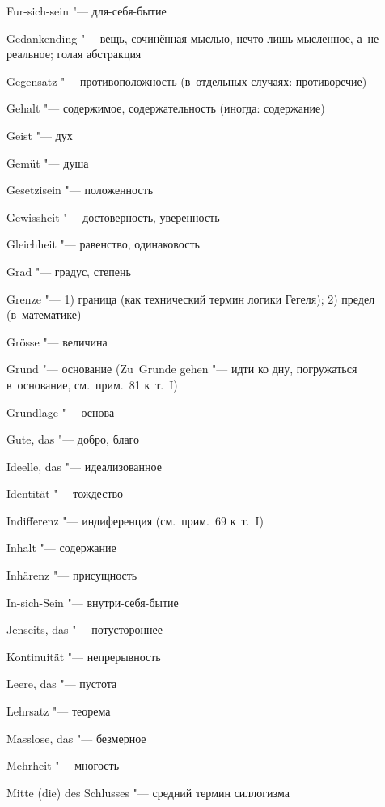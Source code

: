 \begin{multicols}{2}
Fur-sich-sein "--- для-себя-бытие

\bigskip

Gedank\-ending "--- вещь, сочинённая мыслью, нечто лишь мысленное,
а~не реальное; голая абстракция

Gegen\-satz "--- противоположность (в~отдельных случаях:
противоречие)

Gehalt "--- содержимое, содержательность (иногда: содержание)

Geist "--- дух

Gemüt "--- душа

Gesetzi\-sein "--- положенность

Gewiss\-heit "--- достоверность, уверенность

Gleich\-heit "--- равенство, одинаковость

Grad "--- градус, степень

Grenze "--- 1) граница (как технический термин логики Гегеля); 2) предел
(в~математике)

Grösse "--- величина

Grund "--- основание (Zu~Grunde gehen "--- идти ко дну,
погружаться в~основание, см.~прим.~81 к~т.~I)

Grundlage "--- основа

Gute, das "--- добро, благо

\bigskip

Ideelle, das "--- идеализованное

Identität "--- тождество

Indiffe\-renz "--- индиференция (см.~прим.~69 к~т.~I)

Inhalt "--- содержание

Inhärenz "--- присущность

In-sich-Sein "--- внутри-себя-бытие

\bigskip

Jenseits, das "--- потустороннее

\bigskip

Kontinui\-tät "--- непрерывность

\bigskip

Leere, das "--- пустота

Lehrsatz "--- теорема

\bigskip

Masslose, das "--- безмерное

Mehrheit "--- многость

Mitte (die) des Schlusses "--- средний термин силлогизма

\bigskip


\end{multicols}
